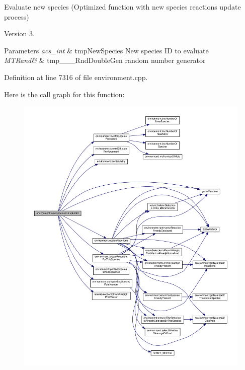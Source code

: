 Evaluate new species (Optimized function with new species reactions update process) 

\begin{DoxyVersion}{Version}
3. 
\end{DoxyVersion}

\begin{DoxyParams}{Parameters}
{\em acs\-\_\-int} & tmp\-New\-Species New species I\-D to evaluate \\
\hline
{\em M\-T\-Rand\&} & tmp\-\_\-\-\_\-\-\_\-\-Rnd\-Double\-Gen random number generator \\
\hline
\end{DoxyParams}


Definition at line 7316 of file environment.\-cpp.



Here is the call graph for this function\-:\nopagebreak
\begin{figure}[H]
\begin{center}
\leavevmode
\includegraphics[width=350pt]{a00003_a4fe7891fb38f3f25bb82769af0ddfe19_cgraph}
\end{center}
\end{figure}





